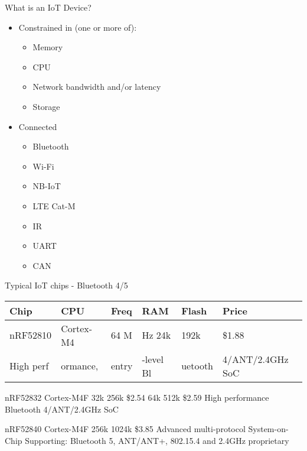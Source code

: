 \begin{frame}{What is an IoT Device?}
\protect\hypertarget{what-is-an-iot-device-1}{}

\begin{itemize}
\tightlist
\item
  Constrained in (one or more of):

  \begin{itemize}
  \tightlist
  \item
    Memory
  \item
    CPU
  \item
    Network bandwidth and/or latency
  \item
    Storage
  \end{itemize}
\item
  Connected

  \begin{itemize}
  \tightlist
  \item
    Bluetooth
  \item
    Wi-Fi
  \item
    NB-IoT
  \item
    LTE Cat-M 
  \item
    IR
  \item
    UART
  \item
    CAN
  \end{itemize}
\end{itemize}

\note{}

\end{frame}

\begin{frame}{Typical IoT chips - Bluetooth 4/5}
\protect\hypertarget{typical-iot-chips---bluetooth-45}{}

\begin{longtable}[]{@{}llllll@{}}
\toprule
Chip & CPU & Freq & RAM & Flash & Price\tabularnewline
\midrule
\endhead
nRF52810 & Cortex-M4 & 64 M & Hz 24k & 192k & \$1.88\tabularnewline
High perf & ormance, & entry & -level Bl & uetooth & 4/ANT/2.4GHz
SoC\tabularnewline
\bottomrule
\end{longtable}

nRF52832 Cortex-M4F 32k 256k \$2.54 64k 512k \$2.59 High performance
Bluetooth 4/ANT/2.4GHz SoC

nRF52840 Cortex-M4F 256k 1024k \$3.85 Advanced multi-protocol
System-on-Chip Supporting: Bluetooth 5, ANT/ANT+, 802.15.4 and 2.4GHz
proprietary


\end{frame}

